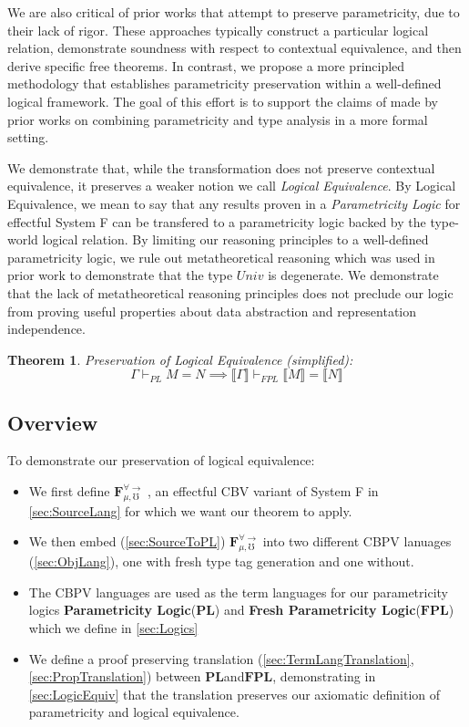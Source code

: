 \documentclass[acmsmall]{acmart}
\newcommand{\den}[1]{\llbracket #1\rrbracket}
\newcommand{\source}{$\mathbf{F}_{\mu,\mho}^{\forall\to}\;$}
\newcommand{\pl}{$\mathbf{PL}$}
\newcommand{\fpl}{$\mathbf{FPL}$}
\newtheorem*{theorem*}{Theorem}
\begin{document}
We are also critical of prior works that attempt to preserve parametricity, due to their lack of rigor. These approaches typically construct a particular logical relation, demonstrate soundness with respect to contextual equivalence, and then derive specific free theorems. In contrast, we propose a more principled methodology that establishes parametricity preservation within a well-defined logical framework. The goal of this effort is to support the claims of made by prior works on combining parametricity and type analysis in a more formal setting.

We demonstrate that, while the transformation does not preserve contextual equivalence, it preserves a weaker notion we call \emph{Logical Equivalence}. By Logical Equivalence, we mean to say that any results proven in a \emph{Parametricity Logic}\cite{APL}\cite{LAPL}\cite{PE} for effectful System F can be transfered to a parametricity logic backed by the type-world logical relation. By limiting our reasoning principles to a well-defined parametricity logic, we rule out metatheoretical reasoning which was used in prior work\cite{TwoParamVSThreeUniv} to demonstrate that the type $Univ$ is degenerate. We demonstrate that the lack of metatheoretical reasoning principles does not preclude our logic from proving useful properties about data abstraction and representation independence. 

\begin{theorem*}
  \label{thm:logicalequivsimple}
  Preservation of Logical Equivalence (simplified):
  $$\Gamma \vdash_{PL} M = N \implies \den{\Gamma} \vdash_{FPL} \den{M} = \den{N}$$
\end{theorem*}



\subsection{Overview}
To demonstrate our preservation of logical equivalence:
\begin{itemize}
  \item We first define \source, an effectful CBV variant of System F in \cref{sec:SourceLang} for which we want our theorem to apply.
  \item We then embed (\cref{sec:SourceToPL}) \source into two different CBPV lanuages (\cref{sec:ObjLang}), one with fresh type tag generation and one without.
  \item The CBPV languages are used as the term languages for our parametricity logics \textbf{Parametricity Logic}(\pl) and \textbf{Fresh Parametricity Logic}(\fpl) which we define in \cref{sec:Logics}
  \item We define a proof preserving translation (\cref{sec:TermLangTranslation}, \cref{sec:PropTranslation}) between \pl\;and\;\fpl\;, demonstrating in \cref{sec:LogicEquiv} that the translation preserves our axiomatic definition of parametricity and logical equivalence.
\end{itemize}
\end{document}
